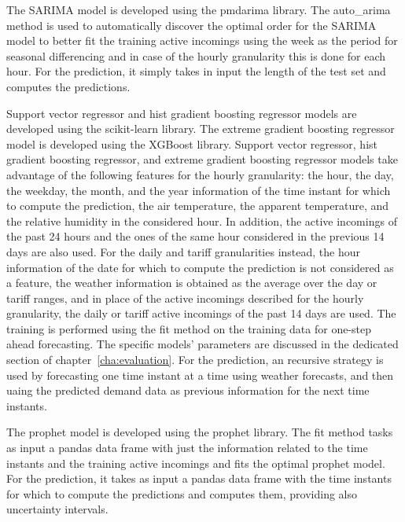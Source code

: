 The SARIMA model is developed using the pmdarima library.
The auto\_arima method is used to automatically discover the optimal order for the SARIMA model to better fit the training active incomings using the week as the period for seasonal differencing and in case of the hourly granularity this is done for each hour.
For the prediction, it simply takes in input the length of the test set and computes the predictions.

Support vector regressor and hist gradient boosting regressor models are developed using the scikit-learn library.
The extreme gradient boosting regressor model is developed using the XGBoost library.
Support vector regressor, hist gradient boosting regressor, and extreme gradient boosting regressor models take advantage of the following features for the hourly granularity: the hour, the day, the weekday, the month, and the year information of the time instant for which to compute the prediction, the air temperature, the apparent temperature, and the relative humidity in the considered hour.
In addition, the active incomings of the past 24 hours and the ones of the same hour considered in the previous 14 days are also used.
For the daily and tariff granularities instead, the hour information of the date for which to compute the prediction is not considered as a feature, the weather information is obtained as the average over the day or tariff ranges, and in place of the active incomings described for the hourly granularity, the daily or tariff active incomings of the past 14 days are used.
The training is performed using the fit method on the training data for one-step ahead forecasting.
The specific models' parameters are discussed in the dedicated section of chapter~\ref{cha:evaluation}.
For the prediction, an recursive strategy is used by forecasting one time instant at a time using weather forecasts, and then uaing the predicted demand data as previous information for the next time instants.

The prophet model is developed using the prophet library.
The fit method tasks as input a pandas data frame with just the information related to the time instants and the training active incomings and fits the optimal prophet model.
For the prediction, it takes as input a pandas data frame with the time instants for which to compute the predictions and computes them, providing also uncertainty intervals.

